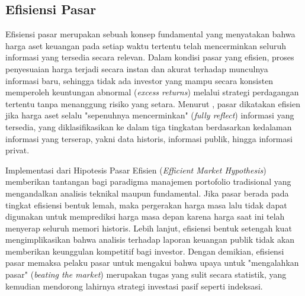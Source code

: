 \subsection{Efisiensi Pasar}

Efisiensi pasar merupakan sebuah konsep fundamental yang menyatakan bahwa harga aset keuangan pada setiap waktu tertentu telah mencerminkan seluruh informasi yang tersedia secara relevan. Dalam kondisi pasar yang efisien, proses penyesuaian harga terjadi secara instan dan akurat terhadap munculnya informasi baru, sehingga tidak ada investor yang mampu secara konsisten memperoleh keuntungan abnormal (\textit{excess returns}) melalui strategi perdagangan tertentu tanpa menanggung risiko yang setara. Menurut \cite{fama_1970}, pasar dikatakan efisien jika harga aset selalu "sepenuhnya mencerminkan" (\textit{fully reflect}) informasi yang tersedia, yang diklasifikasikan ke dalam tiga tingkatan berdasarkan kedalaman informasi yang terserap, yakni data historis, informasi publik, hingga informasi privat.

Implementasi dari Hipotesis Pasar Efisien (\textit{Efficient Market Hypothesis}) memberikan tantangan bagi paradigma manajemen portofolio tradisional yang mengandalkan analisis teknikal maupun fundamental. Jika pasar berada pada tingkat efisiensi bentuk lemah, maka pergerakan harga masa lalu tidak dapat digunakan untuk memprediksi harga masa depan karena harga saat ini telah menyerap seluruh memori historis. Lebih lanjut, efisiensi bentuk setengah kuat mengimplikasikan bahwa analisis terhadap laporan keuangan publik tidak akan memberikan keunggulan kompetitif bagi investor. Dengan demikian, efisiensi pasar memaksa pelaku pasar untuk mengakui bahwa upaya untuk "mengalahkan pasar" (\textit{beating the market}) merupakan tugas yang sulit secara statistik, yang kemudian mendorong lahirnya strategi investasi pasif seperti indeksasi.

